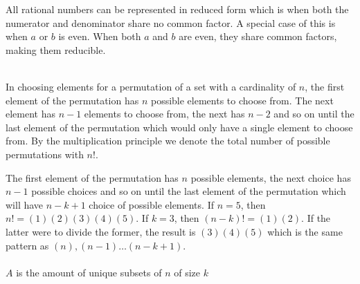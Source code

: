 \documentclass[a4paper,12pt]{article}
\begin{document}
All rational numbers can be represented in reduced form which is when both the numerator and denominator share no common factor. A special case of this is when $a$ or $b$ is even. When both $a$ and $b$ are even, they share common factors, making them reducible.\bigskip\\
\medskip\\
\medskip

In choosing elements for a permutation of a set with a cardinality of $n$, the first element of the permutation has $n$ possible elements to choose from. The next element has $n-1$ elements to choose from, the next has $n-2$ and so on until the last element of the permutation which would only have a single element to choose from. By the multiplication principle we denote the total number of possible permutations with $n!$.\bigskip\\
\medskip

The first element of the permutation has $n$ possible elements, the next choice has $n-1$ possible choices and so on until the last element of the permutation which will have $n-k+1$ choice of possible elements. If $n=5$, then $n!=(1)(2)(3)(4)(5)$. If $k=3$, then $(n-k)!=(1)(2)$. If the latter were to divide the former, the result is $(3)(4)(5)$ which is the same pattern as $(n),(n-1) \dots (n-k+1)$.\bigskip\\
\medskip\\
$A$ is the amount of unique subsets of $n$ of size $k$\bigskip\\
\medskip
\end{document}
